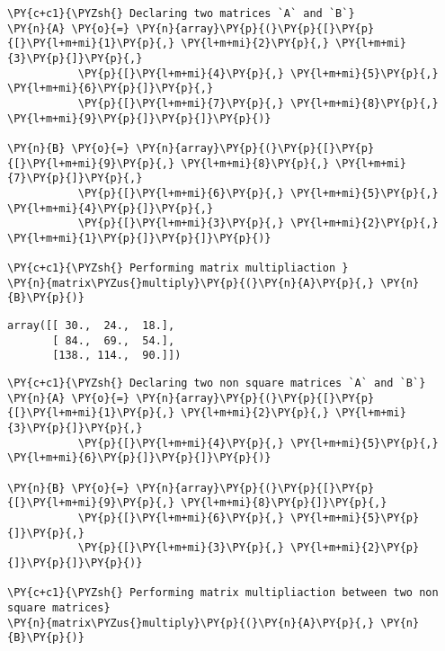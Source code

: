     \begin{tcolorbox}[breakable, size=fbox, boxrule=1pt, pad at break*=1mm,colback=cellbackground, colframe=cellborder]
\begin{Verbatim}[commandchars=\\\{\}]
\PY{c+c1}{\PYZsh{} Declaring two matrices `A` and `B`}
\PY{n}{A} \PY{o}{=} \PY{n}{array}\PY{p}{(}\PY{p}{[}\PY{p}{[}\PY{l+m+mi}{1}\PY{p}{,} \PY{l+m+mi}{2}\PY{p}{,} \PY{l+m+mi}{3}\PY{p}{]}\PY{p}{,}
           \PY{p}{[}\PY{l+m+mi}{4}\PY{p}{,} \PY{l+m+mi}{5}\PY{p}{,} \PY{l+m+mi}{6}\PY{p}{]}\PY{p}{,}
           \PY{p}{[}\PY{l+m+mi}{7}\PY{p}{,} \PY{l+m+mi}{8}\PY{p}{,} \PY{l+m+mi}{9}\PY{p}{]}\PY{p}{]}\PY{p}{)}

\PY{n}{B} \PY{o}{=} \PY{n}{array}\PY{p}{(}\PY{p}{[}\PY{p}{[}\PY{l+m+mi}{9}\PY{p}{,} \PY{l+m+mi}{8}\PY{p}{,} \PY{l+m+mi}{7}\PY{p}{]}\PY{p}{,}
           \PY{p}{[}\PY{l+m+mi}{6}\PY{p}{,} \PY{l+m+mi}{5}\PY{p}{,} \PY{l+m+mi}{4}\PY{p}{]}\PY{p}{,}
           \PY{p}{[}\PY{l+m+mi}{3}\PY{p}{,} \PY{l+m+mi}{2}\PY{p}{,} \PY{l+m+mi}{1}\PY{p}{]}\PY{p}{]}\PY{p}{)}

\PY{c+c1}{\PYZsh{} Performing matrix multipliaction }
\PY{n}{matrix\PYZus{}multiply}\PY{p}{(}\PY{n}{A}\PY{p}{,} \PY{n}{B}\PY{p}{)}
\end{Verbatim}
\end{tcolorbox}

            \begin{tcolorbox}[breakable, size=fbox, boxrule=.5pt, pad at break*=1mm, opacityfill=0]
\begin{Verbatim}[commandchars=\\\{\}]
array([[ 30.,  24.,  18.],
       [ 84.,  69.,  54.],
       [138., 114.,  90.]])
\end{Verbatim}
\end{tcolorbox}
        
    \begin{tcolorbox}[breakable, size=fbox, boxrule=1pt, pad at break*=1mm,colback=cellbackground, colframe=cellborder]
\begin{Verbatim}[commandchars=\\\{\}]
\PY{c+c1}{\PYZsh{} Declaring two non square matrices `A` and `B`}
\PY{n}{A} \PY{o}{=} \PY{n}{array}\PY{p}{(}\PY{p}{[}\PY{p}{[}\PY{l+m+mi}{1}\PY{p}{,} \PY{l+m+mi}{2}\PY{p}{,} \PY{l+m+mi}{3}\PY{p}{]}\PY{p}{,}
           \PY{p}{[}\PY{l+m+mi}{4}\PY{p}{,} \PY{l+m+mi}{5}\PY{p}{,} \PY{l+m+mi}{6}\PY{p}{]}\PY{p}{]}\PY{p}{)}

\PY{n}{B} \PY{o}{=} \PY{n}{array}\PY{p}{(}\PY{p}{[}\PY{p}{[}\PY{l+m+mi}{9}\PY{p}{,} \PY{l+m+mi}{8}\PY{p}{]}\PY{p}{,}
           \PY{p}{[}\PY{l+m+mi}{6}\PY{p}{,} \PY{l+m+mi}{5}\PY{p}{]}\PY{p}{,}
           \PY{p}{[}\PY{l+m+mi}{3}\PY{p}{,} \PY{l+m+mi}{2}\PY{p}{]}\PY{p}{]}\PY{p}{)}

\PY{c+c1}{\PYZsh{} Performing matrix multipliaction between two non square matrices}
\PY{n}{matrix\PYZus{}multiply}\PY{p}{(}\PY{n}{A}\PY{p}{,} \PY{n}{B}\PY{p}{)}
\end{Verbatim}
\end{tcolorbox}

